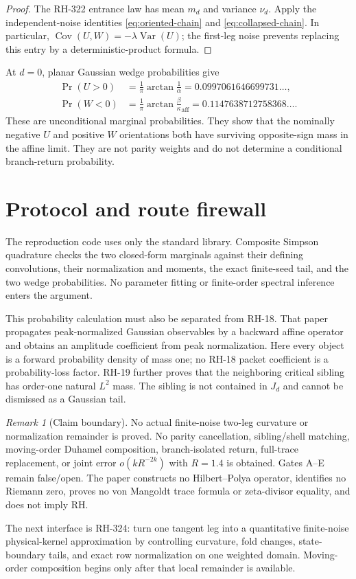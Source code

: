 \documentclass[11pt]{article}
\theoremstyle{remark}
\newtheorem{remark}[theorem]{Remark}
\newcommand{\ka}{\kappa_{\mathrm{aff}}}
\begin{document}
\begin{proof}
The RH-322 entrance law has mean $m_d$ and variance $\nu_d$.  Apply the
independent-noise identities \eqref{eq:oriented-chain} and
\eqref{eq:collapsed-chain}.  In particular,
$\operatorname{Cov}(U,W)=-\lambda\operatorname{Var}(U)$; the first-leg noise
prevents replacing this entry by a deterministic-product formula.
\end{proof}

At $d=0$, planar Gaussian wedge probabilities give
\begin{align}
 \Pr(U>0)
 &=\frac1\pi\arctan\frac1\alpha
 =0.0997061646699731\ldots,
 \label{eq:u-leak}\\
 \Pr(W<0)
 &=\frac1\pi\arctan\frac\beta\ka
 =0.1147638712758368\ldots.
 \label{eq:w-leak}
\end{align}
These are unconditional marginal probabilities.  They show that the
nominally negative $U$ and positive $W$ orientations both have surviving
opposite-sign mass in the affine limit.  They are not parity weights and do
not determine a conditional branch-return probability.

\section{Protocol and route firewall}

The reproduction code uses only the standard library.  Composite Simpson
quadrature checks the two closed-form marginals against their defining
convolutions, their normalization and moments, the exact finite-seed tail,
and the two wedge probabilities.  No parameter fitting or finite-order
spectral inference enters the argument.

This probability calculation must also be separated from RH-18.  That paper
propagates peak-normalized Gaussian observables by a backward affine operator
and obtains an amplitude coefficient from peak normalization.  Here every
object is a forward probability density of mass one; no RH-18 packet
coefficient is a probability-loss factor.  RH-19 further proves that the
neighboring critical sibling has order-one natural $L^2$ mass.  The sibling
is not contained in $J_d$ and cannot be dismissed as a Gaussian tail.

\begin{remark}[Claim boundary]
No actual finite-noise two-leg curvature or normalization remainder is
proved.  No parity cancellation, sibling/shell matching, moving-order
Duhamel composition, branch-isolated return, full-trace replacement, or
joint error $o(kR^{-2k})$ with $R=1.4$ is obtained.  Gates A--E remain
false/open.  The paper constructs no Hilbert--Polya operator, identifies no
Riemann zero, proves no von Mangoldt trace formula or zeta-divisor equality,
and does not imply RH.
\end{remark}

The next interface is RH-324: turn one tangent leg into a quantitative
finite-noise physical-kernel approximation by controlling curvature, fold
changes, state-boundary tails, and exact row normalization on one weighted
domain.  Moving-order composition begins only after that local remainder is
available.
\end{document}
